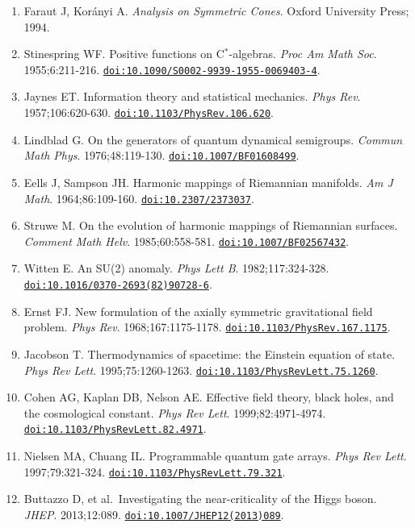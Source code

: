\documentclass[
  11pt,
  a4paper,
]{article}
\providecommand{\tightlist}{%
  \setlength{\itemsep}{0pt}\setlength{\parskip}{0pt}}
\begin{document}
\begin{enumerate}
\def\labelenumi{\arabic{enumi}.}
\tightlist
\item
  Faraut J, Korányi A. \emph{Analysis on Symmetric Cones}. Oxford University Press; 1994.
\item
  Stinespring WF. Positive functions on C\(^*\)-algebras. \emph{Proc Am Math Soc}. 1955;6:211-216. \href{https://doi.org/10.1090/S0002-9939-1955-0069403-4}{\nolinkurl{doi:10.1090/S0002-9939-1955-0069403-4}}.
\item
  Jaynes ET. Information theory and statistical mechanics. \emph{Phys Rev}. 1957;106:620-630. \href{https://doi.org/10.1103/PhysRev.106.620}{\nolinkurl{doi:10.1103/PhysRev.106.620}}.
\item
  Lindblad G. On the generators of quantum dynamical semigroups. \emph{Commun Math Phys}. 1976;48:119-130. \href{https://doi.org/10.1007/BF01608499}{\nolinkurl{doi:10.1007/BF01608499}}.
\item
  Eells J, Sampson JH. Harmonic mappings of Riemannian manifolds. \emph{Am J Math}. 1964;86:109-160. \href{https://doi.org/10.2307/2373037}{\nolinkurl{doi:10.2307/2373037}}.
\item
  Struwe M. On the evolution of harmonic mappings of Riemannian surfaces. \emph{Comment Math Helv}. 1985;60:558-581. \href{https://doi.org/10.1007/BF02567432}{\nolinkurl{doi:10.1007/BF02567432}}.
\item
  Witten E. An SU(2) anomaly. \emph{Phys Lett B}. 1982;117:324-328. \href{https://doi.org/10.1016/0370-2693(82)90728-6}{\nolinkurl{doi:10.1016/0370-2693(82)90728-6}}.
\item
  Ernst FJ. New formulation of the axially symmetric gravitational field problem. \emph{Phys Rev}. 1968;167:1175-1178. \href{https://doi.org/10.1103/PhysRev.167.1175}{\nolinkurl{doi:10.1103/PhysRev.167.1175}}.
\item
  Jacobson T. Thermodynamics of spacetime: the Einstein equation of state. \emph{Phys Rev Lett}. 1995;75:1260-1263. \href{https://doi.org/10.1103/PhysRevLett.75.1260}{\nolinkurl{doi:10.1103/PhysRevLett.75.1260}}.
\item
  Cohen AG, Kaplan DB, Nelson AE. Effective field theory, black holes, and the cosmological constant. \emph{Phys Rev Lett}. 1999;82:4971-4974. \href{https://doi.org/10.1103/PhysRevLett.82.4971}{\nolinkurl{doi:10.1103/PhysRevLett.82.4971}}.
\item
  Nielsen MA, Chuang IL. Programmable quantum gate arrays. \emph{Phys Rev Lett}. 1997;79:321-324. \href{https://doi.org/10.1103/PhysRevLett.79.321}{\nolinkurl{doi:10.1103/PhysRevLett.79.321}}.
\item
  Buttazzo D, et al.~Investigating the near-criticality of the Higgs boson. \emph{JHEP}. 2013;12:089. \href{https://doi.org/10.1007/JHEP12(2013)089}{\nolinkurl{doi:10.1007/JHEP12(2013)089}}.
\end{enumerate}
\end{document}
